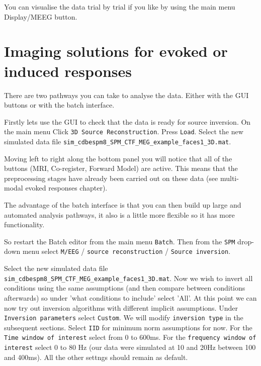 You can visualise the data trial by trial if you like by using the main menu Display/MEEG button.
\section{Imaging solutions for evoked or induced responses}

There are two pathways you can take to analyse the data. Either with the GUI buttons or with the batch interface. 

Firstly lets use the GUI to check that the data is ready for source inversion. On the main menu Click \texttt{3D Source Reconstruction}. Press \texttt{Load}. Select the new simulated data file \texttt{sim\_cdbespm8\_SPM\_CTF\_MEG\_example\_faces1\_3D.mat}.

Moving left to right along the bottom panel you will notice that all of the buttons (MRI, Co-register, Forward Model) are active. This means that the preprocessing stages have already been carried out on these data (see multi-modal evoked responses chapter).

 The advantage of the batch interface is that you can then build up large and automated analysis pathways, it also is a little more flexible so it has more functionality.

So restart the Batch editor from the main menu \texttt{Batch}. Then from the \texttt{SPM} drop-down menu select \texttt{M/EEG} / \texttt{source reconstruction} / \texttt{Source inversion}.

Select the new simulated data file \texttt{sim\_cdbespm8\_SPM\_CTF\_MEG\_example\_faces1\_3D.mat}.
Now we wish to invert all conditions using the same assumptions (and then compare between conditions afterwards) so under 'what conditions to include' select 'All'.
At this point we can now try out inversion algorithms with different implicit assumptions. Under \texttt{Inversion parameters} select \texttt{Custom}.
We will modify \texttt{inversion type} in the subsequent sections. Select \texttt{IID} for minimum norm assumptions for now.
For the \texttt{Time window of interest} select from 0 to 600ms. For the \texttt{frequency window of interest} select 0 to 80 Hz  (our data were simulated at 10 and 20Hz between 100 and 400ms).
All the other settngs should remain as default.

